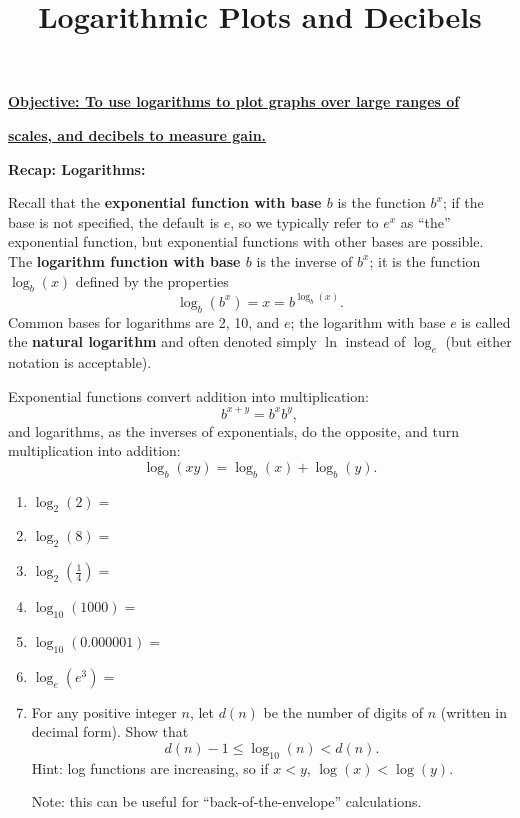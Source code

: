 \documentclass{article}
\begin{document}
\title{Logarithmic Plots and Decibels}
\date{}

\maketitle
\thispagestyle{empty}

\Large

\vskip -10mm

\textbf{\underline{Objective: To use logarithms to plot graphs over large ranges of}}

\textbf{\underline{scales, and decibels to measure gain.}}



\vspace{5mm}



\textbf{Recap: Logarithms:}\bigskip

Recall that the \textbf{exponential function with base $b$} is the function $b^x$; if the base is not specified, the default is $e$, so we typically refer to $e^x$ as ``the'' exponential function, but exponential functions with other bases are possible. The \textbf{logarithm function with base $b$} is the inverse of $b^x$; it is the function $\log_b(x)$ defined by the properties
\[\log_b(b^x)=x=b^{\log_b(x)}.\]
Common bases for logarithms are 2, 10, and $e$; the logarithm with base $e$ is called the \textbf{natural logarithm} and often denoted simply $\ln$ instead of $\log_e$ (but either notation is acceptable).

Exponential functions convert addition into multiplication:
\[b^{x+y}=b^xb^y,\]
and logarithms, as the inverses of exponentials, do the opposite, and turn multiplication into addition:
\[\log_b(xy)=\log_b(x)+\log_b(y).\]


\begin{enumerate}
	\item $\log_2(2)=$
	\item $\log_2(8)=$
	\item $\log_2\left(\frac{1}{4}\right)=$
	\item $\log_{10}(1000)=$
	\item $\log_{10}(0.000001)=$
	\item $\log_e(e^3)=$
	\item For any positive integer $n$, let $d(n)$ be the number of digits of $n$ (written in decimal form). Show that
		\[d(n)-1\leq\log_{10}(n)< d(n).\]
		Hint: log functions are increasing, so if $x<y$, $\log(x)<\log(y)$.
		
		Note: this can be useful for ``back-of-the-envelope'' calculations.
\end{enumerate}
\end{document}
